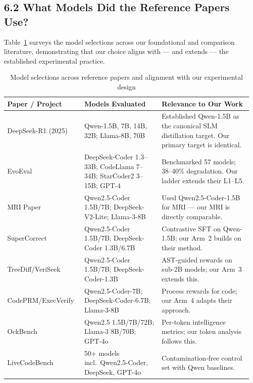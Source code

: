 \documentclass[12pt, a4paper]{article}
\begin{document}
\subsection{6.2 What Models Did the Reference Papers Use?}

Table~\ref{tab:paper_models} surveys the model selections across our foundational and comparison literature, demonstrating that our choice aligns with --- and extends --- the established experimental practice.

\begin{table}[ht!]
\centering
\caption{Model selections across reference papers and alignment with our experimental design}
\label{tab:paper_models}
\renewcommand{\arraystretch}{1.25}
{\footnotesize
\begin{tabularx}{\textwidth}{l X X}
\toprule
\textbf{Paper / Project} & \textbf{Models Evaluated} & \textbf{Relevance to Our Work} \\
\midrule
DeepSeek-R1 (2025) & Qwen-1.5B, 7B, 14B, 32B; Llama-8B, 70B & Established Qwen-1.5B as the canonical SLM distillation target. Our primary target is identical. \\
EvoEval~\cite{evoeval} & DeepSeek-Coder 1.3--33B; CodeLlama 7--34B; StarCoder2 3--15B; GPT-4 & Benchmarked 57 models; 38--40\% degradation. Our ladder extends their L1--L5. \\
MRI Paper~\cite{memorize_or_generalize} & Qwen2.5-Coder 1.5B/7B; DeepSeek-V2-Lite; Llama-3-8B & Used Qwen2.5-Coder-1.5B for MRI --- our MRI is directly comparable. \\
SuperCorrect~\cite{supercorrect} & Qwen2.5-Coder 1.5B/7B; DeepSeek-Coder 1.3B/6.7B & Contrastive SFT on Qwen-1.5B; our Arm~2 builds on their method. \\
TreeDiff/VeriSeek~\cite{treediff, veriseek} & Qwen2.5-Coder 1.5B/7B; DeepSeek-Coder-1.3B & AST-guided rewards on sub-2B models; our Arm~3 extends this. \\
CodePRM/ExecVerify~\cite{codeprm, execverify} & Qwen2.5-Coder-7B; DeepSeek-Coder-6.7B; Llama-3-8B & Process rewards for code; our Arm~4 adapts their approach. \\
OckBench~\cite{ockbench} & Qwen2.5 1.5B/7B/72B; Llama-3 8B/70B; GPT-4o & Per-token intelligence metrics; our token analysis follows this. \\
LiveCodeBench~\cite{livecodebench} & 50+ models incl.\ Qwen2.5-Coder, DeepSeek, GPT-4o & Contamination-free control set with Qwen baselines. \\
\bottomrule
\end{tabularx}
}
\end{table}
\end{document}
